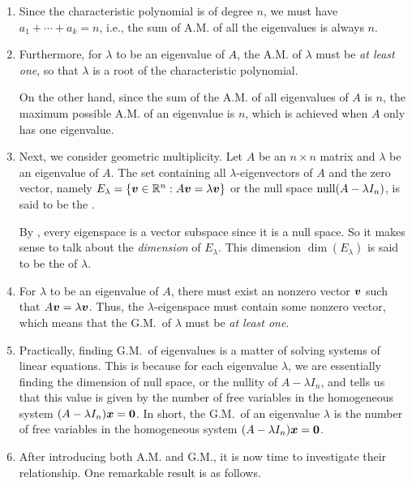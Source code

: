 \begin{enumerate}
\item \label{it:am-sum2n} Since the characteristic polynomial is of degree
\(n\), we must have \(a_1+\dotsb+a_k=n\), i.e., the sum of A.M. of all the
eigenvalues is always \(n\).

\item \label{it:am-bounds} Furthermore, for \(\lambda\) to be an eigenvalue of
\(A\), the A.M. of \(\lambda\) must be \emph{at least one}, so that
\(\lambda\) is a root of the characteristic polynomial.

On the other hand, since the sum of the A.M. of all eigenvalues of \(A\) is
\(n\), the maximum possible A.M. of an eigenvalue is \(n\), which is achieved
when \(A\) only has one eigenvalue.

\item Next, we consider geometric multiplicity. Let \(A\) be an \(n\times n\)
matrix and \(\lambda\) be an eigenvalue of \(A\). The set containing all
\(\lambda\)-eigenvectors of \(A\) and the zero vector, namely
\(E_{\lambda}=\{\vb*{v}\in\mathbb{R}^n:A\vb*{v}=\lambda\vb*{v}\}\) or the null space
\(\operatorname{null}(A-\lambda I_n)\), is said to be the .

By , every eigenspace is a vector subspace since it
is a null space. So it makes sense to talk about the \emph{dimension} of
\(E_{\lambda}\). This dimension \(\dim(E_{\lambda})\) is said to be the
 of \(\lambda\).

\item \label{it:gm-lb} For \(\lambda\) to be an eigenvalue of \(A\), there must
exist an nonzero vector \(\vb*{v}\) such that \(A\vb*{v}=\lambda\vb*{v}\).
Thus, the \(\lambda\)-eigenspace must contain some nonzero vector, which means
that the G.M.\ of \(\lambda\) must be \emph{at least one}.

\item Practically, finding G.M.\ of eigenvalues is a matter of solving systems
of linear equations. This is because for each eigenvalue \(\lambda\), we are
essentially finding the dimension of null space, or the nullity of \(A-\lambda
I_n\), and  tells us that this value is given by
the number of free variables in the homogeneous system
\((A-\lambda I_n)\vb*{x}=\vb*{0}\). In short, the G.M.\ of an eigenvalue
\(\lambda\) is the number of free variables in the homogeneous system
\((A-\lambda I_n)\vb*{x}=\vb*{0}\).

\item After introducing both A.M. and G.M., it is now time to investigate their
relationship. One remarkable result is as follows.


\end{enumerate}
